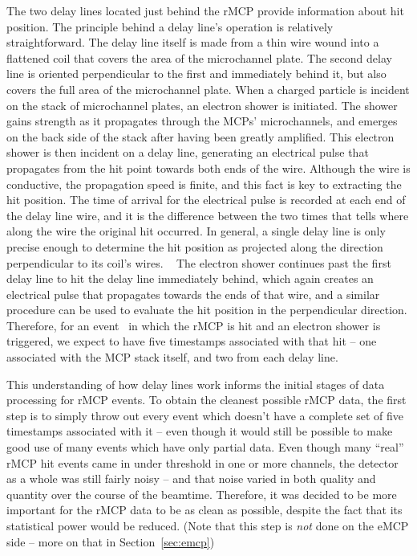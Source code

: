 The two delay lines located just behind the rMCP provide information about hit position.  The principle behind a delay line's operation is relatively straightforward.  The delay line itself is made from a thin wire wound into a flattened coil that covers the area of the microchannel plate.  The second delay line is oriented perpendicular to the first and immediately behind it, but also covers the full area of the microchannel plate.  When a charged particle is incident on the stack of microchannel plates, an electron shower is initiated.  The shower gains strength as it propagates through the MCPs' microchannels, and emerges on the back side of the stack after having been greatly amplified.  This electron shower is then incident on a delay line, generating an electrical pulse that propagates from the hit point towards both ends of the wire.  Although the wire is conductive, the propagation speed is finite, and this fact is key to extracting the hit position.  The time of arrival for the electrical pulse is recorded at each end of the delay line wire, and it is the difference between the two times that tells where along the wire the original hit occurred.  In general, a single delay line is only precise enough to determine the hit position as projected along the direction perpendicular to its coil's wires.
~ 
The electron shower continues past the first delay line to hit the delay line immediately behind, which again creates an electrical pulse that propagates towards the ends of that wire, and a similar procedure can be used to evaluate the hit position in the perpendicular direction.  Therefore, for an event~ in which the rMCP is hit and an electron shower is triggered, we expect to have five timestamps associated with that hit -- one associated with the MCP stack itself, and two from each delay line.

This understanding of how delay lines work informs the initial stages of data processing for rMCP events.  To obtain the cleanest possible rMCP data, the first step is to simply throw out every event which doesn't have a complete set of five timestamps associated with it -- even though it would still be possible to make good use of many events which have only partial data.  Even though many ``real'' rMCP hit events came in under threshold in one or more channels, the detector as a whole was still fairly noisy -- and that noise varied in both quality and quantity over the course of the beamtime.  Therefore, it was decided to be more important for the rMCP data to be as clean as possible, despite the fact that its statistical power would be reduced. (Note that this step is \emph{not} done on the eMCP side -- more on that in Section~\ref{sec:emcp})~  

